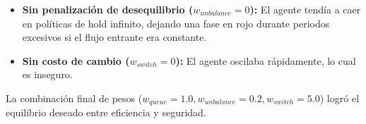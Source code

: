 \begin{itemize}
    \item \textbf{Sin penalización de desequilibrio ($w_{unbalance}=0$):} El agente tendía a caer en políticas de hold infinito, dejando una fase en rojo durante periodos excesivos si el flujo entrante era constante.
    \item \textbf{Sin costo de cambio ($w_{switch}=0$):} El agente oscilaba rápidamente, lo cual es inseguro.
\end{itemize}
La combinación final de pesos ($w_{queue}=1.0, w_{unbalance}=0.2, w_{switch}=5.0$) logró el equilibrio deseado entre eficiencia y seguridad.
